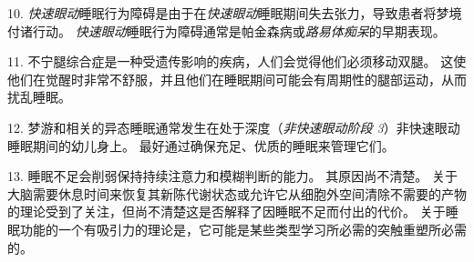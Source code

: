 10. \textit{快速眼动}睡眠行为障碍是由于在\textit{快速眼动}睡眠期间失去张力，导致患者将梦境付诸行动。
\textit{快速眼动}睡眠行为障碍通常是帕金森病或\textit{路易体痴呆}的早期表现。


11. 不宁腿综合症是一种受遗传影响的疾病，人们会觉得他们必须移动双腿。
这使他们在觉醒时非常不舒服，并且他们在睡眠期间可能会有周期性的腿部运动，从而扰乱睡眠。


12. 梦游和相关的异态睡眠通常发生在处于深度（\textit{非快速眼动阶段 3}）非快速眼动睡眠期间的幼儿身上。
最好通过确保充足、优质的睡眠来管理它们。


13. 睡眠不足会削弱保持持续注意力和模糊判断的能力。
其原因尚不清楚。
关于大脑需要休息时间来恢复其新陈代谢状态或允许它从细胞外空间清除不需要的产物的理论受到了关注，但尚不清楚这是否解释了因睡眠不足而付出的代价。
关于睡眠功能的一个有吸引力的理论是，它可能是某些类型学习所必需的突触重塑所必需的。


